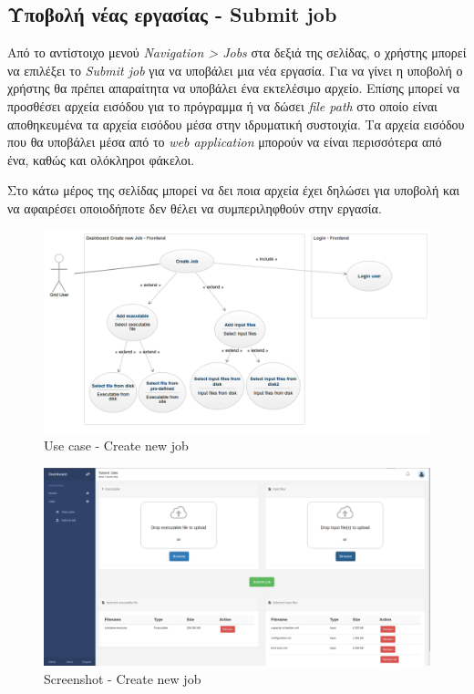 \subsection{Υποβολή νέας εργασίας - Submit job}

Από το αντίστοιχο μενού \textit{Navigation > Jobs} στα δεξιά της σελίδας, ο χρήστης μπορεί να επιλέξει το \textit{Submit job} για να υποβάλει μια νέα εργασία.  
\newline
Για να γίνει η υποβολή ο χρήστης θα πρέπει απαραίτητα να υποβάλει ένα εκτελέσιμο αρχείο. 
Επίσης μπορεί να προσθέσει αρχεία εισόδου για το πρόγραμμα ή να δώσει  \textit{file path} στο οποίο είναι αποθηκευμένα τα αρχεία εισόδου μέσα στην ιδρυματική συστοιχία. Τα αρχεία εισόδου που θα υποβάλει μέσα από το \textit{web application} μπορούν να είναι περισσότερα από ένα, καθώς και ολόκληροι φάκελοι. 
\newline

Στο κάτω μέρος της σελίδας μπορεί να δει ποια αρχεία έχει δηλώσει για υποβολή και να αφαιρέσει οποιοδήποτε δεν θέλει να συμπεριληφθούν στην εργασία.
\newline

\begin{figure}[bp!]
\caption{Use case - Create new job}
\includegraphics[width=16cm]{../images/create-job-case.png}
\centering
\end{figure}
\clearpage

\begin{figure}[bp!]
\caption{Screenshot - Create new job}
\includegraphics[width=16cm]{../images/submit-job-screenshot.png}
\centering
\end{figure}
\clearpage


